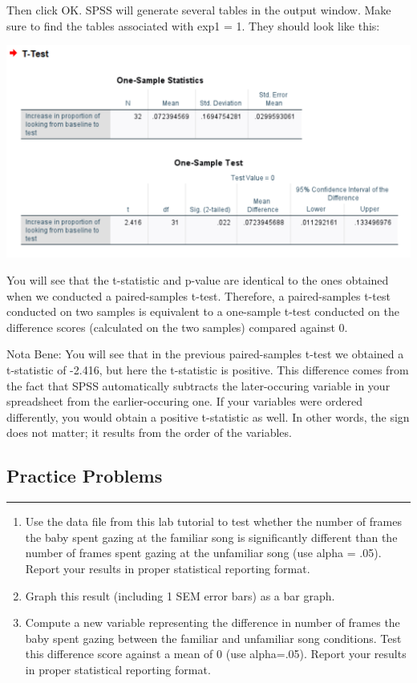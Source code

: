 \documentclass[]{book}
\begin{document}
Then click {OK}. SPSS will generate several tables in the output window.
Make sure to find the tables associated with exp1 = 1. They should look
like this:

\includegraphics{img/6.4.33.png}

You will see that the t-statistic and p-value are identical to the ones
obtained when we conducted a paired-samples t-test. Therefore, a
paired-samples t-test conducted on two samples is equivalent to a
one-sample t-test conducted on the difference scores (calculated on the
two samples) compared against 0.

Nota Bene: You will see that in the previous paired-samples t-test we
obtained a t-statistic of -2.416, but here the t-statistic is positive.
This difference comes from the fact that SPSS automatically subtracts
the later-occuring variable in your spreadsheet from the
earlier-occuring one. If your variables were ordered differently, you
would obtain a positive t-statistic as well. In other words, the sign
does not matter; it results from the order of the variables.

\subsection{Practice Problems}\label{practice-problems-6}

\begin{center}\rule{0.5\linewidth}{0.5pt}\end{center}

\begin{enumerate}
\def\labelenumi{\arabic{enumi}.}
\item
  Use the data file from this lab tutorial to test whether the number of
  frames the baby spent gazing at the familiar song is significantly
  different than the number of frames spent gazing at the unfamiliar
  song (use alpha = .05). Report your results in proper statistical
  reporting format.
\item
  Graph this result (including 1 SEM error bars) as a bar graph.
\item
  Compute a new variable representing the difference in number of frames
  the baby spent gazing between the familiar and unfamiliar song
  conditions. Test this difference score against a mean of 0 (use
  alpha=.05). Report your results in proper statistical reporting
  format.
\end{enumerate}
\end{document}
